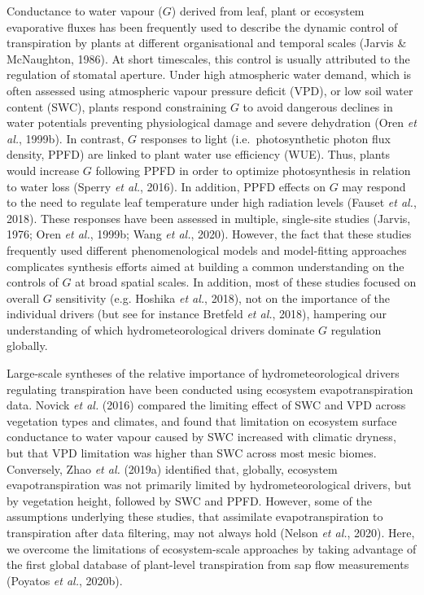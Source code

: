 \documentclass[11pt,twoside]{reedthesis}
\begin{document}
Conductance to water vapour (\(G\)) derived from leaf, plant or
ecosystem evaporative fluxes has been frequently used to describe the
dynamic control of transpiration by plants at different organisational
and temporal scales (Jarvis \& McNaughton, 1986). At short timescales,
this control is usually attributed to the regulation of stomatal
aperture. Under high atmospheric water demand, which is often assessed
using atmospheric vapour pressure deficit (VPD), or low soil water
content (SWC), plants respond constraining \(G\) to avoid dangerous
declines in water potentials preventing physiological damage and severe
dehydration (Oren \emph{et al.}, 1999b). In contrast, \(G\) responses to
light (i.e.~photosynthetic photon flux density, PPFD) are linked to
plant water use efficiency (WUE). Thus, plants would increase \(G\)
following PPFD in order to optimize photosynthesis in relation to water
loss (Sperry \emph{et al.}, 2016). In addition, PPFD effects on \(G\)
may respond to the need to regulate leaf temperature under high
radiation levels (Fauset \emph{et al.}, 2018). These responses have been
assessed in multiple, single-site studies (Jarvis, 1976; Oren \emph{et
al.}, 1999b; Wang \emph{et al.}, 2020). However, the fact that these
studies frequently used different phenomenological models and
model-fitting approaches complicates synthesis efforts aimed at building
a common understanding on the controls of \(G\) at broad spatial scales.
In addition, most of these studies focused on overall \(G\) sensitivity
(e.g. Hoshika \emph{et al.}, 2018), not on the importance of the
individual drivers (but see for instance Bretfeld \emph{et al.}, 2018),
hampering our understanding of which hydrometeorological drivers
dominate \(G\) regulation globally.\par

Large-scale syntheses of the relative importance of hydrometeorological
drivers regulating transpiration have been conducted using ecosystem
evapotranspiration data. Novick \emph{et al.} (2016) compared the
limiting effect of SWC and VPD across vegetation types and climates, and
found that limitation on ecosystem surface conductance to water vapour
caused by SWC increased with climatic dryness, but that VPD limitation
was higher than SWC across most mesic biomes. Conversely, Zhao \emph{et
al.} (2019a) identified that, globally, ecosystem evapotranspiration was
not primarily limited by hydrometeorological drivers, but by vegetation
height, followed by SWC and PPFD. However, some of the assumptions
underlying these studies, that assimilate evapotranspiration to
transpiration after data filtering, may not always hold (Nelson \emph{et
al.}, 2020). Here, we overcome the limitations of ecosystem-scale
approaches by taking advantage of the first global database of
plant-level transpiration from sap flow measurements (Poyatos \emph{et
al.}, 2020b).\par
\end{document}
